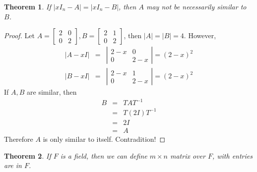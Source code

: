 \documentclass{article}
\theoremstyle{MyNonumberplain}
\theoremstyle{break}
\newtheorem*{proof}{Proof. }
\theoremstyle{break}
\newtheorem{theorem}{Theorem}[section]
\theoremstyle{break}
\theoremstyle{definition}
\theoremstyle{break}
\begin{document}
\begin{thmbox}
    \begin{theorem}
        If $| x I_n - A | = | x I_n - B |$, then $A$ may not be necessarily similar to
        $B$.
    \end{theorem}
    \begin{prfbox}
        \begin{proof}
            Let $A = \left[\begin{array}{cc}
                2 & 0\\
                0 & 2
              \end{array}\right], B = \left[\begin{array}{cc}
                2 & 1\\
                0 & 2
              \end{array}\right]$, then $| A | = | B | = 4$. However,
              \begin{eqnarray*}
                | A - x I | & = & \left|\begin{array}{cc}
                  2 - x & 0\\
                  0 & 2 - x
                \end{array}\right| = (2 - x)^2\\
                | B - x I | & = & \left|\begin{array}{cc}
                  2 - x & 1\\
                  0 & 2 - x
                \end{array}\right| = (2 - x)^2
              \end{eqnarray*}
              If $A, B$ are similar, then
              \begin{eqnarray*}
                B & = & T A T^{- 1}\\
                & = & T (2 I) T^{- 1}\\
                & = & 2 I\\
                & = & A
              \end{eqnarray*}
              Therefore $A$ is only similar to itself. Contradition!
        \end{proof}
    \end{prfbox}
\end{thmbox}

\begin{thmbox}
    \begin{theorem}
        If $F$ is a field, then we can define $m \times n$ matrix over $F$, with
        entries are in $F$.       
    \end{theorem}
\end{thmbox}
\end{document}
